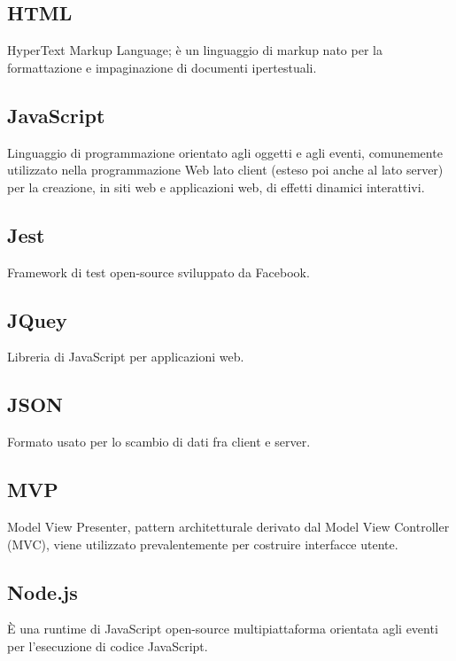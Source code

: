 \documentclass[../manuale_sviluppatore.tex]{subfiles}
\begin{document}
\subsection*{HTML}
{}
HyperText Markup Language; è un linguaggio di markup nato per la formattazione e impaginazione di documenti ipertestuali.

\subsection*{JavaScript}
{}
Linguaggio di programmazione orientato agli oggetti e agli eventi, comunemente utilizzato nella programmazione Web lato client (esteso poi anche al lato server) per la creazione, in siti web e applicazioni web, di effetti dinamici interattivi.

\subsection*{Jest}
{}
Framework di test open-source sviluppato da Facebook.

\subsection*{JQuey}
{}
Libreria di JavaScript per applicazioni web.

\subsection*{JSON}
{}
Formato usato per lo scambio di dati fra client e server.

\subsection*{MVP}
{}
Model View Presenter, pattern architetturale derivato dal Model View Controller (MVC), viene utilizzato prevalentemente per costruire interfacce utente.

\subsection*{Node.js}
{}
È una runtime di JavaScript open-source multipiattaforma orientata agli eventi per l’esecuzione di codice JavaScript.
\end{document}
